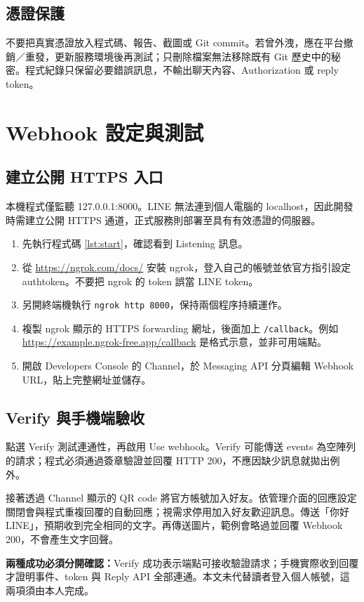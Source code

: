 \documentclass[12pt,a4paper]{report}
\begin{document}
\section{憑證保護}
不要把真實憑證放入程式碼、報告、截圖或 Git commit。若曾外洩，應在平台撤銷／重發，更新服務環境後再測試；只刪除檔案無法移除既有 Git 歷史中的秘密。程式紀錄只保留必要錯誤訊息，不輸出聊天內容、Authorization 或 reply token。
\clearpage
\chapter{Webhook 設定與測試}
\section{建立公開 HTTPS 入口}
本機程式僅監聽 127.0.0.1:8000。LINE 無法連到個人電腦的 localhost，因此開發時需建立公開 HTTPS 通道，正式服務則部署至具有有效憑證的伺服器。
\begin{enumerate}
\item 先執行程式碼 \ref{lst:start}，確認看到 Listening 訊息。
\item 從 \url{https://ngrok.com/docs/} 安裝 ngrok，登入自己的帳號並依官方指引設定 authtoken。不要把 ngrok 的 token 誤當 LINE token。
\item 另開終端機執行 \texttt{ngrok http 8000}，保持兩個程序持續運作。
\item 複製 ngrok 顯示的 HTTPS forwarding 網址，後面加上 \texttt{/callback}。例如 \url{https://example.ngrok-free.app/callback} 是格式示意，並非可用端點。
\item 開啟 Developers Console 的 Channel，於 Messaging API 分頁編輯 Webhook URL，貼上完整網址並儲存。
\end{enumerate}
\section{Verify 與手機端驗收}
點選 Verify 測試連通性，再啟用 Use webhook。Verify 可能傳送 events 為空陣列的請求；程式必須通過簽章驗證並回覆 HTTP 200，不應因缺少訊息就拋出例外。

接著透過 Channel 顯示的 QR code 將官方帳號加入好友。依管理介面的回應設定關閉會與程式重複回覆的自動回應；視需求停用加入好友歡迎訊息。傳送「你好 LINE」，預期收到完全相同的文字。再傳送圖片，範例會略過並回覆 Webhook 200，不會產生文字回聲。

\textbf{兩種成功必須分開確認：}Verify 成功表示端點可接收驗證請求；手機實際收到回覆才證明事件、token 與 Reply API 全部連通。本文未代替讀者登入個人帳號，這兩項須由本人完成。
\end{document}
